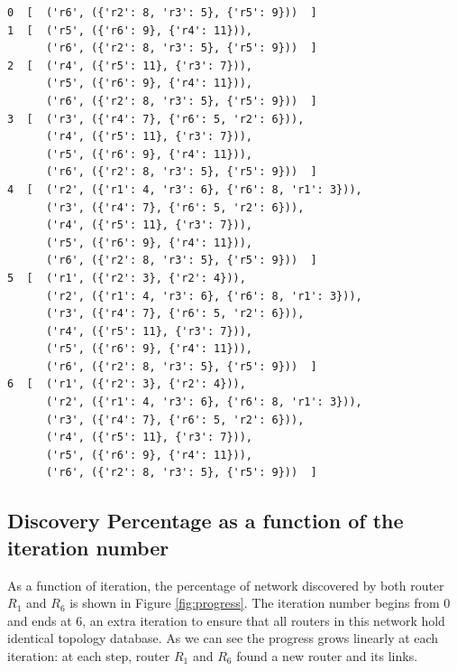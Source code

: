 \documentclass[12pt]{article}  %
\theoremstyle{definition}
\theoremstyle{remark}
\begin{document}
\begin{lstlisting}
0  [  ('r6', ({'r2': 8, 'r3': 5}, {'r5': 9}))  ]
1  [  ('r5', ({'r6': 9}, {'r4': 11})),
      ('r6', ({'r2': 8, 'r3': 5}, {'r5': 9}))  ]
2  [  ('r4', ({'r5': 11}, {'r3': 7})),
      ('r5', ({'r6': 9}, {'r4': 11})),
      ('r6', ({'r2': 8, 'r3': 5}, {'r5': 9}))  ]
3  [  ('r3', ({'r4': 7}, {'r6': 5, 'r2': 6})),
      ('r4', ({'r5': 11}, {'r3': 7})),
      ('r5', ({'r6': 9}, {'r4': 11})),
      ('r6', ({'r2': 8, 'r3': 5}, {'r5': 9}))  ]
4  [  ('r2', ({'r1': 4, 'r3': 6}, {'r6': 8, 'r1': 3})),
      ('r3', ({'r4': 7}, {'r6': 5, 'r2': 6})),
      ('r4', ({'r5': 11}, {'r3': 7})),
      ('r5', ({'r6': 9}, {'r4': 11})),
      ('r6', ({'r2': 8, 'r3': 5}, {'r5': 9}))  ]
5  [  ('r1', ({'r2': 3}, {'r2': 4})),
      ('r2', ({'r1': 4, 'r3': 6}, {'r6': 8, 'r1': 3})),
      ('r3', ({'r4': 7}, {'r6': 5, 'r2': 6})),
      ('r4', ({'r5': 11}, {'r3': 7})),
      ('r5', ({'r6': 9}, {'r4': 11})),
      ('r6', ({'r2': 8, 'r3': 5}, {'r5': 9}))  ]
6  [  ('r1', ({'r2': 3}, {'r2': 4})),
      ('r2', ({'r1': 4, 'r3': 6}, {'r6': 8, 'r1': 3})),
      ('r3', ({'r4': 7}, {'r6': 5, 'r2': 6})),
      ('r4', ({'r5': 11}, {'r3': 7})),
      ('r5', ({'r6': 9}, {'r4': 11})),
      ('r6', ({'r2': 8, 'r3': 5}, {'r5': 9}))  ]
\end{lstlisting}

\subsection{Discovery Percentage as a function of the iteration number}
As a function of iteration, the percentage of network discovered by both router $R_1$ and $R_6$ is shown in Figure \ref{fig:progress}.
The iteration number begins from 0 and ends at 6, an extra iteration to ensure that all routers in this network hold identical topology database.
As we can see the progress grows linearly at each iteration: at each step, router $R_1$ and $R_6$ found a new router and its links.
\end{document}
